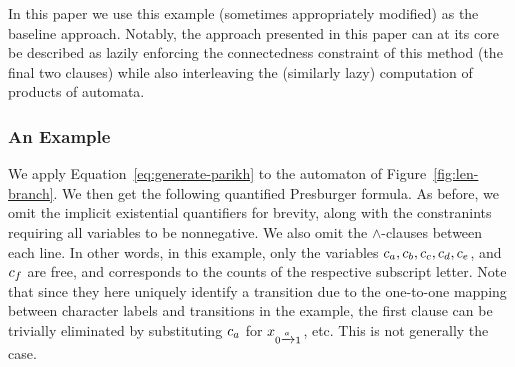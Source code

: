 \documentclass[acmsmall,review,anonymous]{acmart}\settopmatter{printfolios=true,printccs=false,printacmref=true}
\theoremstyle{definition}
\begin{document}
In this paper we use this example (sometimes appropriately modified) as the
baseline approach. Notably, the approach presented in this paper can at its core
be described as lazily enforcing the connectedness constraint of this method
(the final two clauses) while also interleaving the (similarly lazy) computation
of products of automata.

\subsubsection{An Example}
We apply Equation~\ref{eq:generate-parikh} to the automaton of Figure~\ref{fig:len-branch}. We then get the following quantified Presburger formula. As before, we omit the implicit existential quantifiers for brevity, along with the constranints requiring all variables to be nonnegative. We also omit the $\land$-clauses between each line. In other words, in this example, only the variables $c_a, c_b, c_c, c_d, c_e$, and $c_f$ are free, and corresponds to the counts of the respective subscript letter. Note that since they here uniquely identify a transition due to the one-to-one mapping between character labels and transitions in the example, the first clause can be trivially eliminated by substituting $c_a$ for $x_{0 \xrightarrow{a} 1}$, etc. This is not generally the case.
\end{document}
